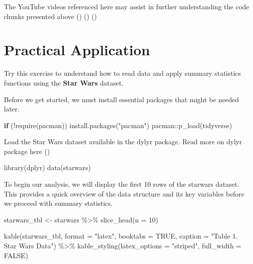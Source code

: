\documentclass[
  man,
  floatsintext,
  longtable,
  nolmodern,
  notxfonts,
  notimes,
  colorlinks=true,linkcolor=blue,citecolor=blue,urlcolor=blue]{apa7}
\newenvironment{Shaded}{\begin{snugshade}}{\end{snugshade}}
\newcommand{\AttributeTok}[1]{\textcolor[rgb]{0.40,0.45,0.13}{#1}}
\newcommand{\ConstantTok}[1]{\textcolor[rgb]{0.56,0.35,0.01}{#1}}
\newcommand{\ControlFlowTok}[1]{\textcolor[rgb]{0.00,0.23,0.31}{\textbf{#1}}}
\newcommand{\DecValTok}[1]{\textcolor[rgb]{0.68,0.00,0.00}{#1}}
\newcommand{\FunctionTok}[1]{\textcolor[rgb]{0.28,0.35,0.67}{#1}}
\newcommand{\NormalTok}[1]{\textcolor[rgb]{0.00,0.23,0.31}{#1}}
\newcommand{\OtherTok}[1]{\textcolor[rgb]{0.00,0.23,0.31}{#1}}
\newcommand{\SpecialCharTok}[1]{\textcolor[rgb]{0.37,0.37,0.37}{#1}}
\newcommand{\StringTok}[1]{\textcolor[rgb]{0.13,0.47,0.30}{#1}}
\begin{document}
The YouTube videos referenced here may assist in further understanding
the code chunks presented above
()
()
()

\section{Practical Application}\label{practical-application}

Try this exercise to understand how to read data and apply summary
statistics functions using the \textbf{Star Wars} dataset.

Before we get started, we must install essential packages that might be
needed later.

\begin{Shaded}
\begin{Highlighting}[]
\ControlFlowTok{if}\NormalTok{ (}\SpecialCharTok{!}\FunctionTok{require}\NormalTok{(pacman)) }\FunctionTok{install.packages}\NormalTok{(}\StringTok{"pacman"}\NormalTok{)}
\NormalTok{pacman}\SpecialCharTok{::}\FunctionTok{p\_load}\NormalTok{(tidyverse)}
\end{Highlighting}
\end{Shaded}

Load the Star Wars dataset available in the dylyr package. Read more on
dylyr package here ()

\begin{Shaded}
\begin{Highlighting}[]
\FunctionTok{library}\NormalTok{(dplyr)}
\FunctionTok{data}\NormalTok{(starwars)}
\end{Highlighting}
\end{Shaded}

To begin our analysis, we will display the first 10 rows of the starwars
dataset. This provides a quick overview of the data structure and its
key variables before we proceed with summary statistics.

\begin{Shaded}
\begin{Highlighting}[]
\NormalTok{starwars\_tbl }\OtherTok{\textless{}{-}}\NormalTok{ starwars }\SpecialCharTok{\%\textgreater{}\%}
  \FunctionTok{slice\_head}\NormalTok{(}\AttributeTok{n =} \DecValTok{10}\NormalTok{)}

\FunctionTok{kable}\NormalTok{(starwars\_tbl, }\AttributeTok{format =} \StringTok{"latex"}\NormalTok{, }\AttributeTok{booktabs =} \ConstantTok{TRUE}\NormalTok{, }\AttributeTok{caption =} \StringTok{"Table 1. Star Wars Data"}\NormalTok{) }\SpecialCharTok{\%\textgreater{}\%}
  \FunctionTok{kable\_styling}\NormalTok{(}\AttributeTok{latex\_options =} \StringTok{"striped"}\NormalTok{, }\AttributeTok{full\_width =} \ConstantTok{FALSE}\NormalTok{)}
\end{Highlighting}
\end{Shaded}
\end{document}
